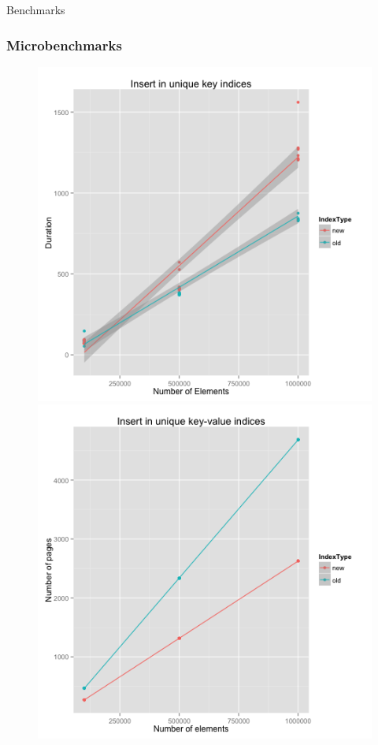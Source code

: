 \documentclass{beamer}
\begin{document}
  \begin{section}{Benchmarks}
    \begin{frame}
      \frametitle{Microbenchmarks}
      \begin{figure}
        \includegraphics[scale=0.3]{images/unique_random_insert.png}
        \quad
        \pause
        \includegraphics[scale=0.3]{images/nonUnique_random_insert_nodes.png}

\end{figure}
\end{frame}
\end{section}
\end{document}
